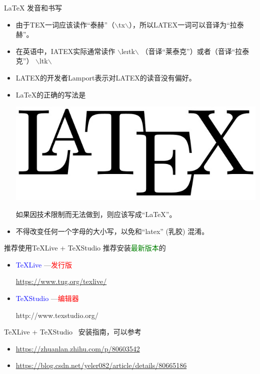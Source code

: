 \documentclass[13pt]{ctexbeamer}
\newcommand{\red}[1]{\textcolor{red}{#1}}
\newcommand{\blue}[1]{\textcolor{blue}{#1}}
\newcommand{\green}[1]{\textcolor{green}{#1}}
\begin{document}
\begin{frame}{LaTeX 发音和书写}
	\begin{itemize}
\item 	由于TEX一词应该读作“泰赫”（$\backslash$t\textepsilon x$\backslash$），所以LATEX一词可以音译为“拉泰赫”。
\item
	在英语中，IATEX实际通常读作
$\backslash$le\i t\textepsilon k$\backslash$
（音译“莱泰克”）或者（音译“拉泰克”）
$\backslash$l\textscripta\textlengthmark t\textepsilon k$\backslash$
\item
	LATEX的开发者Lamport表示对LATEX的读音没有偏好。
		\end{itemize}
	\vspace{15pt}
		\begin{itemize}
\item
LaTeX的正确的写法是
\begin{center}
\includegraphics[scale=0.08]{LATEX.jpg}
\end{center}
如果因技术限制而无法做到，则应该写成“LaTeX”。
\item
不得改变任何一个字母的大小写，以免和“latex” (乳胶) 混淆。
	\end{itemize}







\end{frame}


    \begin{frame}{推荐使用TeXLive + TeXStudio }
    	推荐安装\green{最新版本}的

    	\begin{itemize}
    		\item \blue{TeXLive}  ---\red{发行版}

    		\href{https://www.tug.org/texlive/}{https://www.tug.org/texlive/}



    		\item \blue{TeXStudio}    ---\red{编辑器}

    		http://www.texstudio.org/
    	\end{itemize}

    	{TeXLive} + {TeXStudio}   ~安装指南，可以参考
    	\begin{itemize}
    		\item 	\href{https://zhuanlan.zhihu.com/p/80603542}{https://zhuanlan.zhihu.com/p/80603542}
    		\item \href{https://blog.csdn.net/yeler082/article/details/80665186}{https://blog.csdn.net/yeler082/article/details/80665186}
    	\end{itemize}
    \end{frame}
\end{document}
